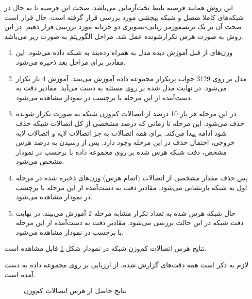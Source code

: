 این روش همانند فرضیه بلیط بخت‌آزمایی
می‌باشد. صحت این فرضیه تا به حال در شبکه‌های کاملا متصل و شبکه پیچشی مورد بررسی قرار گرفته است. حال قرار است صحت آن بر یک ترنسفورمر زبانی-تصویری دو جریانه
 مورد بررسی قرار دهیم.
در این روش به صورت هرس تکرارشونده
عمل شد. مراحل الگوریتم به صورت زیر می‌باشد.
\begin{enumerate}
	\item وزن‌های از قبل آموزش دیده مدل
	به همراه رده‌بند
	به شبکه داده می‌شود. این مقادیر برای مراحل بعد ذخیره می‌شود.
	\item مدل بر روی 3129 جواب پرتکرار مجموعه داده
	آموزش می‌بیند. آموزش  4 بار تکرار
	می‌شود. در نهایت مدل
	شده بر روی مسئله
 به دست می‌آید.	مقادیر دقت به دست‌آمده از این مرحله با برچسب
 در نمودار‌ مشاهده می‌شود.
	\item
	در این مرحله هر بار 10 درصد از اتصالات کم‌وزن شبکه به صورت تکرار شونده حذف می‌شود. این مرحله تا زمانی که درصد مشخصی از کل اتصالات شبکه حذف شود ادامه پیدا می‌کند. برای همه اتصالات به جز اتصالات لایه 
	و اتصالات لایه خروجی، احتمال حذف در این مرحله وجود دارد. پس از رسیدن به درصد هرس مشخص، دقت شبکه هرس شده بر روی مجموعه داده 
	با برچسب 
	در نمودار مشخص می‌شود.
	\item پس حذف مقدار مشخصی از اتصالات (اتمام هرس) وزن‌های ذخیره شده در مرحله اول به شبکه بازنشانی
	 می‌شود. مقادیر دقت به دست‌آمده از این مرحله با برچسب
	در نمودار‌ مشاهده می‌شود.
	\item حال شبکه هرس شده به تعداد تکرار مشابه مرحله 2 آموزش می‌بیند. در نهایت دقت شبکه در این حالت بررسی می‌شود. مقادیر دقت به دست‌آمده از این مرحله با برچسب
	در نمودار‌ مشاهده می‌شود.
\end{enumerate}

نتایج هرس اتصالات کم‌وزن شبکه
 در نمودار شکل \ref{low_pruning} قابل مشاهده است.

لازم به ذکر است همه دقت‌های گزارش شده، از ارزیابی بر روی مجموعه داده 
به دست آمده است.

\begin{figure}[H]
	\caption{نتایج حاصل از هرس اتصالات کم‌وزن}
	\label{low_pruning}
\end{figure}



